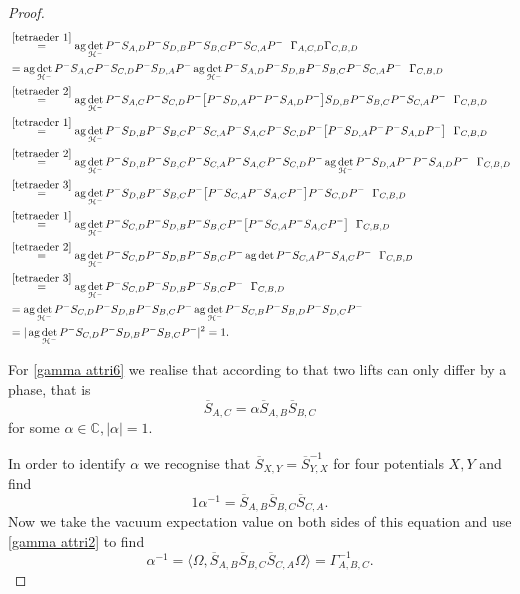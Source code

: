 \documentclass[b5paper,draft,openbib,12pt]{memoir}
\DeclareMathOperator{\ag}{ag}
\begin{document}
\begin{proof}
\begin{align}
&\overset{\eqref{tetraeder 1}}{=}
\ag \det_{\mathcal{H}^-}P^-S_{A,D}P^- S_{D,B}P^-S_{B,C}P^- S_{C,A}P^-   ~~ \Gamma_{A,C,D} \Gamma_{C,B,D}\\
&=\ag \det_{\mathcal{H}^-}P^- S_{A,C}P^- S_{C,D}P^- S_{D,A}P^-
\ag \det_{\mathcal{H}^-}P^-S_{A,D}P^- S_{D,B}P^-S_{B,C}P^- S_{C,A}P^-   ~~ \Gamma_{C,B,D}\\
&\overset{\eqref{tetraeder 2}}{=}
\ag \det_{\mathcal{H}^-}P^- S_{A,C}P^- S_{C,D}P^-\big[ P^- S_{D,A}P^-P^-S_{A,D}P^- \big] S_{D,B}P^-S_{B,C}P^- S_{C,A}P^-   ~~ \Gamma_{C,B,D}\\
&\overset{\eqref{tetraeder 1}}{=}
\ag \det_{\mathcal{H}^-}P^- S_{D,B}P^-S_{B,C}P^- S_{C,A}P^- S_{A,C}P^- S_{C,D}P^-\big[P^- S_{D,A}P^-P^-S_{A,D}P^- \big]    ~~ \Gamma_{C,B,D}\\
&\overset{\eqref{tetraeder 2}}{=}
\ag \det_{\mathcal{H}^-}P^- S_{D,B}P^-S_{B,C}P^- S_{C,A}P^- S_{A,C}P^- S_{C,D}P^- \ag \det_{\mathcal{H}^-} P^-S_{D,A}P^-P^-S_{A,D}P^-    ~~ \Gamma_{C,B,D}\\
&\overset{\eqref{tetraeder 3}}{=}
\ag \det_{\mathcal{H}^-}P^- S_{D,B}P^-S_{B,C}P^-\big[P^- S_{C,A}P^- S_{A,C}P^-\big] P^- S_{C,D}P^-    ~~ \Gamma_{C,B,D}\\
&\overset{\eqref{tetraeder 1}}{=}
\ag \det_{\mathcal{H}^-}P^- S_{C,D}P^- S_{D,B}P^-S_{B,C}P^- \big[P^- S_{C,A}P^- S_{A,C}P^-\big]     ~~ \Gamma_{C,B,D}\\
&\overset{\eqref{tetraeder 2}}{=}
\ag \det_{\mathcal{H}^-}P^- S_{C,D}P^- S_{D,B}P^-S_{B,C}P^- \ag \det P^- S_{C,A}P^- S_{A,C}P^-     ~~ \Gamma_{C,B,D}\\
&\overset{\eqref{tetraeder 3}}{=}
\ag \det_{\mathcal{H}^-}P^- S_{C,D}P^- S_{D,B}P^-S_{B,C}P^-  ~~ \Gamma_{C,B,D}\\
&=
\ag \det_{\mathcal{H}^-}P^- S_{C,D}P^- S_{D,B}P^-S_{B,C}P^-  \ag \det_{\mathcal{H}^-} P^- S_{C,B}P^- S_{B,D}P^- S_{D,C}P^- \\
&=
|\ag \det_{\mathcal{H}^-}P^- S_{C,D}P^- S_{D,B}P^-S_{B,C}P^-|^2=1. 
\end{align}

For \eqref{gamma attri6} we realise that according to \cite{ivp0} that two lifts can only differ by a phase,
that is
\begin{equation}
\overline{S}_{A,C}=\alpha \overline{S}_{A,B} \overline{S}_{B,C}
\end{equation}
for some \(\alpha\in \mathbb{C}, |\alpha|=1\). 

In order to identify \(\alpha\) we recognise that \(\overline{S}_{X,Y}=\overline{S}_{Y,X}^{-1}\) for four potentials \(X,Y\) 
and find
\begin{equation}
1 \alpha^{-1}= \overline{S}_{A,B} \overline{S}_{B,C}\overline{S}_{C,A}.
\end{equation}
Now we take the vacuum expectation value on both sides of this equation and use \eqref{gamma attri2} to find
\begin{equation}
\alpha^{-1}=\langle\Omega,\overline{S}_{A,B} \overline{S}_{B,C}\overline{S}_{C,A}\Omega\rangle = \Gamma_{A,B,C}^{-1}.
\end{equation}


\end{proof}
\end{document}
